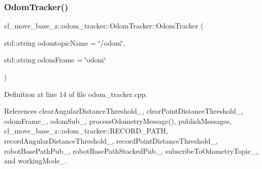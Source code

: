 \subsubsection{\texorpdfstring{Odom\+Tracker()}{OdomTracker()}}
{\footnotesize\ttfamily cl\+\_\+move\+\_\+base\+\_\+z\+::odom\+\_\+tracker\+::\+Odom\+Tracker\+::\+Odom\+Tracker (\begin{DoxyParamCaption}\item[{std\+::string}]{odomtopic\+Name = {\ttfamily \char`\"{}/odom\char`\"{}},  }\item[{std\+::string}]{odom\+Frame = {\ttfamily \char`\"{}odom\char`\"{}} }\end{DoxyParamCaption})}



Definition at line 14 of file odom\+\_\+tracker.\+cpp.



References clear\+Angular\+Distance\+Threshold\+\_\+, clear\+Point\+Distance\+Threshold\+\_\+, odom\+Frame\+\_\+, odom\+Sub\+\_\+, process\+Odometry\+Message(), publish\+Messages, cl\+\_\+move\+\_\+base\+\_\+z\+::odom\+\_\+tracker\+::\+R\+E\+C\+O\+R\+D\+\_\+\+P\+A\+TH, record\+Angular\+Distance\+Threshold\+\_\+, record\+Point\+Distance\+Threshold\+\_\+, robot\+Base\+Path\+Pub\+\_\+, robot\+Base\+Path\+Stacked\+Pub\+\_\+, subscribe\+To\+Odometry\+Topic\+\_\+, and working\+Mode\+\_\+.



